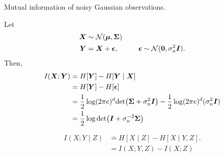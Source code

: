 \begin{example}
  \caption{Mutual information of noisy Gaussian observations.}

  Let 
  \begin{align*}
    \bm{X} &\sim \mathcal{N}(\bm{\mu},\bm{\Sigma}) \\
    \bm{Y} &= \bm{X}+\bm{\epsilon}, \hspace{1cm} \bm{\epsilon} \sim \mathcal{N}(\bm{0}, \sigma_n^2 \bm{I})
  .\end{align*}
  Then,
  \begin{align*}
    I(\vec{X};\vec{Y}) &= H[\vec{Y}] - H[\vec{Y}\mid \vec{X}] \\
    &= H[\vec{Y}] - H[\vec{\epsilon}] \\
    &= \frac{1}{2}\log(2\pi e)^d \det{\mat{\Sigma} + \sigma_n^2 \mat{I}} - \frac{1}{2}\log(2\pi e)^d(\sigma_n^2 \mat{I}) \\
    &= \frac{1}{2} \log \det{\mat{I} + \sigma_n^{-2}\mat{\Sigma}}
  \end{align*}
\end{example}

\begin{definition}
  \begin{align*}
    I(X;Y\mid Z) &\doteq H[X\mid Z] - H[X\mid Y,Z]. \\
    &= I(X;Y,Z) - I(X;Z)
  \end{align*}
\end{definition}
